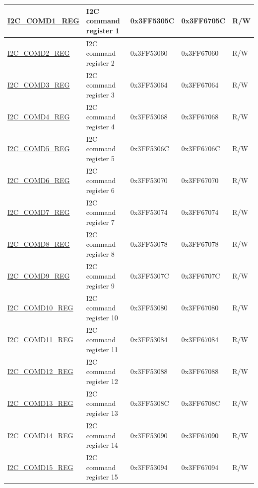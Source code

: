 \documentclass[main.tex]{subfiles}
\begin{document}
\begin{longtable}{ | p{4.8cm} | p{6.5cm} | p{1.8cm} | p{1.8cm} | p{0.7cm} | }
\hyperref[regdesc:I2CCOMDnREG]{I2C\_COMD1\_REG} & I2C command register 1 & 0x3FF5305C & 0x3FF6705C & R/W \\ \hline
\hyperref[regdesc:I2CCOMDnREG]{I2C\_COMD2\_REG} & I2C command register 2 & 0x3FF53060 & 0x3FF67060 & R/W \\ \hline
\hyperref[regdesc:I2CCOMDnREG]{I2C\_COMD3\_REG} & I2C command register 3 & 0x3FF53064 & 0x3FF67064 & R/W \\ \hline
\hyperref[regdesc:I2CCOMDnREG]{I2C\_COMD4\_REG} & I2C command register 4 & 0x3FF53068 & 0x3FF67068 & R/W \\ \hline
\hyperref[regdesc:I2CCOMDnREG]{I2C\_COMD5\_REG} & I2C command register 5 & 0x3FF5306C & 0x3FF6706C & R/W \\ \hline
\hyperref[regdesc:I2CCOMDnREG]{I2C\_COMD6\_REG} & I2C command register 6 & 0x3FF53070 & 0x3FF67070 & R/W \\ \hline
\hyperref[regdesc:I2CCOMDnREG]{I2C\_COMD7\_REG} &I2C command register 7 & 0x3FF53074 & 0x3FF67074 & R/W \\ \hline
\hyperref[regdesc:I2CCOMDnREG]{I2C\_COMD8\_REG} & I2C command register 8 & 0x3FF53078 & 0x3FF67078 & R/W \\ \hline
\hyperref[regdesc:I2CCOMDnREG]{I2C\_COMD9\_REG} & I2C command register 9 & 0x3FF5307C & 0x3FF6707C & R/W \\ \hline
\hyperref[regdesc:I2CCOMDnREG]{I2C\_COMD10\_REG} & I2C command register 10 & 0x3FF53080 & 0x3FF67080 & R/W \\ \hline
\hyperref[regdesc:I2CCOMDnREG]{I2C\_COMD11\_REG} & I2C command register 11 & 0x3FF53084 & 0x3FF67084 & R/W \\ \hline
\hyperref[regdesc:I2CCOMDnREG]{I2C\_COMD12\_REG} & I2C command register 12 & 0x3FF53088 & 0x3FF67088 & R/W \\ \hline
\hyperref[regdesc:I2CCOMDnREG]{I2C\_COMD13\_REG} & I2C command register 13 & 0x3FF5308C & 0x3FF6708C & R/W \\ \hline
\hyperref[regdesc:I2CCOMDnREG]{I2C\_COMD14\_REG} & I2C command register 14 & 0x3FF53090 & 0x3FF67090 & R/W \\ \hline
\hyperref[regdesc:I2CCOMDnREG]{I2C\_COMD15\_REG} & I2C command register 15 & 0x3FF53094 & 0x3FF67094 & R/W \\ \hline
\end{longtable}
\end{document}
